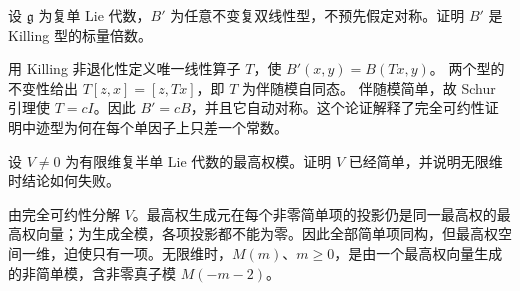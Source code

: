 \begin{exercise}\label{b5:ex:18-adjoint-invariant-form}
	设 \(\mathfrak g\) 为复单 Lie 代数，\(B'\) 为任意不变复双线性型，不预先假定对称。证明 \(B'\) 是 Killing 型的标量倍数。
\end{exercise}
\begin{solution}
	用 Killing 非退化性定义唯一线性算子 \(T\)，使 \(B'(x,y)=B(Tx,y)\)。 两个型的不变性给出 \(T[z,x]=[z,Tx]\)，即 \(T\) 为伴随模自同态。 伴随模简单，故 Schur 引理使 \(T=cI\)。因此 \(B'=cB\)，并且它自动对称。这个论证解释了完全可约性证明中迹型为何在每个单因子上只差一个常数。
\end{solution}

\begin{exercise}\label{b5:ex:18-finite-cyclic-highest-simple}
	设 \(V\ne0\) 为有限维复半单 Lie 代数的最高权模。证明 \(V\) 已经简单，并说明无限维时结论如何失败。
\end{exercise}
\begin{solution}
	由完全可约性分解 \(V\)。最高权生成元在每个非零简单项的投影仍是同一最高权的最高权向量；为生成全模，各项投影都不能为零。因此全部简单项同构，但最高权空间一维，迫使只有一项。无限维时，\(M(m)\)、\(m\ge0\)，是由一个最高权向量生成的非简单模，含非零真子模 \(M(-m-2)\)。
\end{solution}
